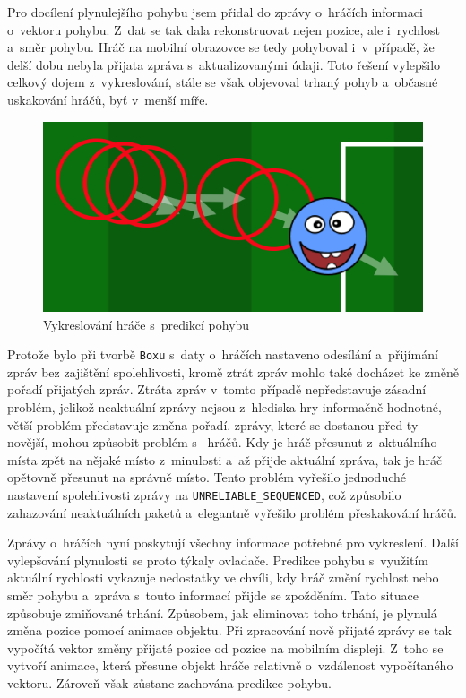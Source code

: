 \documentclass[thesis=B,czech,hidelinks]{FITthesis}[2012/06/26] %
\newcommand{\code}[1]{\texttt{#1}}
\begin{document}
Pro docílení plynulejšího pohybu jsem přidal do zprávy o~hráčích informaci o~vektoru pohybu. Z~dat se tak dala rekonstruovat nejen pozice, ale i~rychlost a~směr pohybu. Hráč na mobilní obrazovce se tedy pohyboval i~v~případě, že delší dobu nebyla přijata zpráva s~aktualizovanými údaji. Toto řešení vylepšilo celkový dojem z~vykreslování, stále se však objevoval trhaný pohyb a~občasné uskakování hráčů, byť v~menší míře.

\begin{figure}[h]
\center
\includegraphics[width=\textwidth]{player_rendering_2}
\caption{Vykreslování hráče s~predikcí pohybu}
\label{picture:player_rendering_2}
\end{figure}

Protože bylo při tvorbě \code{Boxu} s~daty o~hráčích nastaveno odesílání a~přijímání zpráv bez zajištění spolehlivosti, kromě ztrát zpráv mohlo také docházet ke změně pořadí přijatých zpráv. Ztráta zpráv v~tomto případě nepředstavuje zásadní problém, jelikož neaktuální zprávy nejsou z~hlediska hry informačně hodnotné, větší problém představuje změna pořadí.  zprávy, které se dostanou před ty novější, mohou způsobit problém s~ hráčů. Kdy je hráč přesunut z~aktuálního místa zpět na nějaké místo z~minulosti a~až přijde aktuální zpráva, tak je hráč opětovně přesunut na správně místo. Tento problém vyřešilo jednoduché nastavení spolehlivosti zprávy na \code{UNRELIABLE\_SEQUENCED}, což způsobilo zahazování neaktuálních paketů a~elegantně vyřešilo problém přeskakování hráčů.

Zprávy o~hráčích nyní poskytují všechny informace potřebné pro vykreslení. Další vylepšování plynulosti se proto týkaly ovladače. Predikce pohybu s~využitím aktuální rychlosti vykazuje nedostatky ve chvíli, kdy hráč změní rychlost nebo směr pohybu a~zpráva s~touto informací přijde se zpožděním. Tato situace způsobuje zmiňované trhání. Způsobem, jak eliminovat toho trhání, je plynulá změna pozice pomocí animace objektu. Při zpracování nově přijaté zprávy se tak vypočítá vektor změny přijaté pozice od pozice na mobilním displeji. Z~toho se vytvoří animace, která přesune objekt hráče relativně o~vzdálenost vypočítaného vektoru. Zároveň však zůstane zachována predikce pohybu. 
\end{document}
